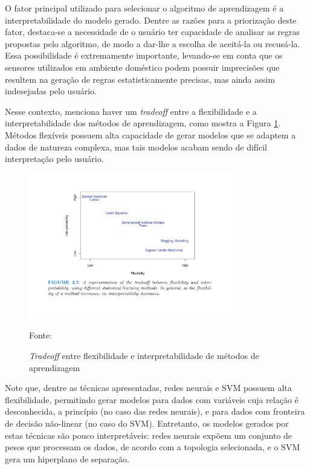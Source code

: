 O fator principal utilizado para selecionar o algoritmo de aprendizagem é a interpretabilidade do modelo gerado. Dentre as razões para a priorização deste fator, destaca-se a necessidade de o usuário ter capacidade de analisar as regras propostas pelo algoritmo, de modo a dar-lhe a escolha de aceitá-la ou recusá-la. Essa possibilidade é extremamente importante, levando-se em conta que os sensores utilizados em ambiente doméstico podem possuir imprecisões que resultem na geração de regras estatisticamente precisas, mas ainda assim indesejadas pelo usuário.

Nesse contexto, \cite{james2014} menciona haver um \textit{tradeoff} entre a flexibilidade e a interpretabilidade dos métodos de aprendizagem, como mostra a Figura \ref{fig:interpretabilidade_algoritmos}. Métodos flexíveis possuem alta capacidade de gerar modelos que se adaptem a dados de natureza complexa, mas tais modelos acabam sendo de difícil interpretação pelo usuário. 

\begin{figure}[h]
	\centering
	\caption{\textit{Tradeoff} entre flexibilidade e interpretabilidade de métodos de aprendizagem}
  \includegraphics[width=0.8\textwidth]{imagens/interpretabilidade_algoritmos.pdf}
  \label{fig:interpretabilidade_algoritmos}  
  
  Fonte: \cite{james2014}
\end{figure}

Note que, dentre as técnicas apresentadas, redes neurais e SVM possuem alta flexibilidade, permitindo gerar modelos para dados com variáveis cuja relação é desconhecida, a princípio (no caso das redes neurais), e para dados com fronteira de decisão não-linear (no caso do SVM). Entretanto, os modelos gerados por estas técnicas são pouco interpretáveis: redes neurais expõem um conjunto de pesos que processam os dados, de acordo com a topologia selecionada, e o SVM gera um hiperplano de separação.

